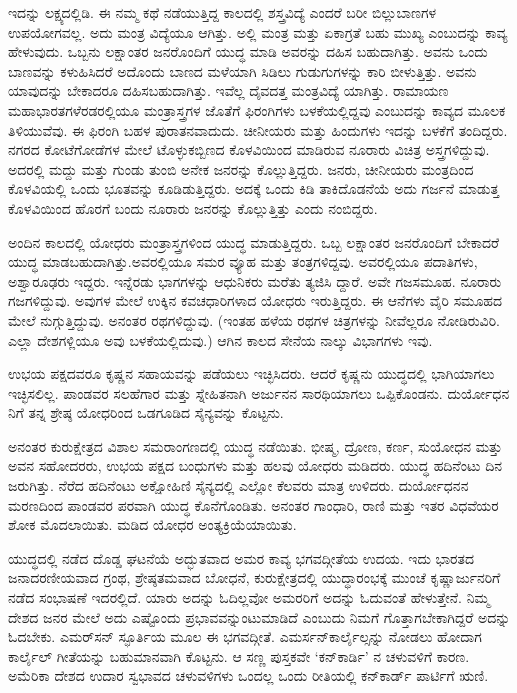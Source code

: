 ಇದನ್ನು ಲಕ್ಷ್ಯದಲ್ಲಿಡಿ. ಈ ನಮ್ಮ ಕಥೆ ನಡೆಯುತ್ತಿದ್ದ ಕಾಲದಲ್ಲಿ ಶಸ್ತ್ರವಿದ್ಯೆ ಎಂದರೆ ಬರೀ ಬಿಲ್ಲುಬಾಣಗಳ ಉಪಯೋಗವಲ್ಲ. ಅದು ಮಂತ್ರ ವಿದ್ಯೆಯೂ ಆಗಿತ್ತು. ಅಲ್ಲಿ ಮಂತ್ರ ಮತ್ತು ಏಕಾಗ್ರತೆ ಬಹು ಮುಖ್ಯ ಎಂಬುದನ್ನು ಕಾವ್ಯ ಹೇಳುವುದು. ಒಬ್ಬನು ಲಕ್ಷಾಂತರ ಜನರೊಂದಿಗೆ ಯುದ್ಧ ಮಾಡಿ ಅವರನ್ನು ದಹಿಸ ಬಹುದಾಗಿತ್ತು. ಅವನು ಒಂದು ಬಾಣವನ್ನು ಕಳುಹಿಸಿದರೆ ಅದೊಂದು ಬಾಣದ ಮಳೆಯಾಗಿ ಸಿಡಿಲು ಗುಡುಗುಗಳನ್ನು ಕಾರಿ ಬೀಳುತ್ತಿತ್ತು. ಅವನು ಯಾವುದನ್ನು ಬೇಕಾದರೂ ದಹಿಸಬಹುದಾಗಿತ್ತು. ಇವೆಲ್ಲ ದೈವದತ್ತ ಮಂತ್ರವಿದ್ಯೆ ಯಾಗಿತ್ತು. ರಾಮಾಯಣ ಮಹಾಭಾರತಗಳೆರಡರಲ್ಲಿಯೂ ಮಂತ್ರಾಸ್ತ್ರಗಳ ಜೊತೆಗೆ ಫಿರಂಗಿಗಳು ಬಳಕೆಯಲ್ಲಿದ್ದವು ಎಂಬುದನ್ನು ಕಾವ್ಯದ ಮೂಲಕ ತಿಳಿಯುವೆವು. ಈ ಫಿರಂಗಿ ಬಹಳ ಪುರಾತನವಾದುದು. ಚೀನೀಯರು ಮತ್ತು ಹಿಂದುಗಳು ಇದನ್ನು ಬಳಕೆಗೆ ತಂದಿದ್ದರು. ನಗರದ ಕೋಟೆಗೋಡೆಗಳ ಮೇಲೆ ಟೊಳ್ಳುಕಬ್ಬಿಣದ ಕೊಳವಿಯಿಂದ ಮಾಡಿರುವ ನೂರಾರು ವಿಚಿತ್ರ ಅಸ್ತ್ರಗಳಿದ್ದುವು. ಅದರಲ್ಲಿ ಮದ್ದು ಮತ್ತು ಗುಂಡು ತುಂಬಿ ಅನೇಕ ಜನರನ್ನು ಕೊಲ್ಲುತ್ತಿದ್ದರು. ಜನರು, ಚೀನೀಯರು ಮಂತ್ರದಿಂದ ಕೊಳವಿಯಲ್ಲಿ ಒಂದು ಭೂತವನ್ನು ಕೂಡಿಡುತ್ತಿದ್ದರು. ಅದಕ್ಕೆ ಒಂದು ಕಿಡಿ ತಾಕಿದೊಡನೆಯೆ ಅದು ಗರ್ಜನೆ ಮಾಡುತ್ತ ಕೊಳವಿಯಿಂದ ಹೊರಗೆ ಬಂದು ನೂರಾರು ಜನರನ್ನು ಕೊಲ್ಲುತ್ತಿತ್ತು ಎಂದು ನಂಬಿದ್ದರು.

ಅಂದಿನ ಕಾಲದಲ್ಲಿ ಯೋಧರು ಮಂತ್ರಾಸ್ತ್ರಗಳಿಂದ ಯುದ್ಧ ಮಾಡುತ್ತಿದ್ದರು. ಒಬ್ಬ ಲಕ್ಷಾಂತರ ಜನರೊಂದಿಗೆ ಬೇಕಾದರೆ ಯುದ್ಧ ಮಾಡಬಹುದಾಗಿತ್ತು.ಅವರಲ್ಲಿಯೂ ಸಮರ ವ್ಯೂಹ ಮತ್ತು ತಂತ್ರಗಳಿದ್ದವು. ಅವರಲ್ಲಿಯೂ ಪದಾತಿಗಳು, ಅಶ್ವಾರೂಢರು ಇದ್ದರು. ಇನ್ನೆರಡು ಭಾಗಗಳನ್ನು ಆಧುನಿಕರು ಮರೆತು ತ್ಯಜಿಸಿ ದ್ದಾರೆ. ಅವೇ ಗಜಸಮೂಹ. ನೂರಾರು ಗಜಗಳಿದ್ದುವು. ಅವುಗಳ ಮೇಲೆ ಉಕ್ಕಿನ ಕವಚಧಾರಿಗಳಾದ ಯೋಧರು ಇರುತ್ತಿದ್ದರು. ಈ ಆನೆಗಳು ವೈರಿ ಸಮೂಹದ ಮೇಲೆ ನುಗ್ಗುತ್ತಿದ್ದುವು. ಅನಂತರ ರಥಗಳಿದ್ದುವು. (ಇಂತಹ ಹಳೆಯ ರಥಗಳ ಚಿತ್ರಗಳನ್ನು ನೀವೆಲ್ಲರೂ ನೋಡಿರುವಿರಿ. ಎಲ್ಲಾ ದೇಶಗಳ್ಲಿಯೂ ಅವು ಬಳಕೆಯಲ್ಲಿದುವು.) ಆಗಿನ ಕಾಲದ ಸೇನೆಯ ನಾಲ್ಕು ವಿಭಾಗಗಳು ಇವು.

ಉಭಯ ಪಕ್ಷದವರೂ ಕೃಷ್ಣನ ಸಹಾಯವನ್ನು ಪಡೆಯಲು ಇಚ್ಛಿಸಿದರು. ಆದರೆ ಕೃಷ್ಣನು ಯುದ್ಧದಲ್ಲಿ ಭಾಗಿಯಾಗಲು ಇಚ್ಛಿಸಲಿಲ್ಲ. ಪಾಂಡವರ ಸಲಹೆಗಾರ ಮತ್ತು ಸ್ನೇಹಿತನಾಗಿ ಅರ್ಜುನನ ಸಾರಥಿಯಾಗಲು ಒಪ್ಪಿಕೊಂಡನು. ದುರ್ಯೋಧನ ನಿಗೆ ತನ್ನ ಶ್ರೇಷ್ಠ ಯೋಧರಿಂದ ಒಡಗೂಡಿದ ಸೈನ್ಯವನ್ನು ಕೊಟ್ಟನು.

ಅನಂತರ ಕುರುಕ್ಷೇತ್ರದ ವಿಶಾಲ ಸಮರಾಂಗಣದಲ್ಲಿ ಯುದ್ಧ ನಡೆಯಿತು. ಭೀಷ್ಮ, ದ್ರೋಣ, ಕರ್ಣ, ಸುಯೋಧನ ಮತ್ತು ಅವನ ಸಹೋದರರು, ಉಭಯ ಪಕ್ಷದ ಬಂಧುಗಳು ಮತ್ತು ಹಲವು ಯೋಧರು ಮಡಿದರು. ಯುದ್ಧ ಹದಿನೆಂಟು ದಿನ ಜರುಗಿತ್ತು. ನೆರೆದ ಹದಿನೆಂಟು ಅಕ್ಷೋಹಿಣಿ ಸೈನ್ಯದಲ್ಲಿ ಎಲ್ಲೋ ಕೆಲವರು ಮಾತ್ರ ಉಳಿದರು. ದುರ್ಯೋಧನನ ಮರಣದಿಂದ ಪಾಂಡವರ ಪರವಾಗಿ ಯುದ್ಧ ಕೊನೆಗೊಂಡಿತು. ಅನಂತರ ಗಾಂಧಾರಿ, ರಾಣಿ ಮತ್ತು ಇತರ ವಿಧವೆಯರ ಶೋಕ ಮೊದಲಾಯಿತು. ಮಡಿದ ಯೋಧರ ಅಂತ್ಯಕ್ರಿಯೆಯಾಯಿತು.

ಯುದ್ಧದಲ್ಲಿ ನಡೆದ ದೊಡ್ಡ ಘಟನೆಯೆ ಅದ್ಭುತವಾದ ಅಮರ ಕಾವ್ಯ ಭಗವದ್ಗೀತೆಯ ಉದಯ. ಇದು ಭಾರತದ ಜನಾದರಣೀಯವಾದ ಗ್ರಂಥ, ಶ್ರೇಷ್ಠತಮವಾದ ಬೋಧನೆ, ಕುರುಕ್ಷೇತ್ರದಲ್ಲಿ ಯುದ್ಧಾರಂಭಕ್ಕೆ ಮುಂಚೆ ಕೃಷ್ಣಾರ್ಜುನರಿಗೆ ನಡೆದ ಸಂಭಾಷಣೆ ಇದರಲ್ಲಿದೆ. ಯಾರು ಅದನ್ನು ಓದಿಲ್ಲವೋ ಅಮರರಿಗೆ ಅದನ್ನು ಓದುವಂತೆ ಹೇಳುತ್ತೇನೆ. ನಿಮ್ಮ ದೇಶದ ಜನರ ಮೇಲೆ ಅದು ಎಷ್ಟೊಂದು ಪ್ರಭಾವವನ್ನುಂಟುಮಾಡಿದೆ ಎಂಬುದು ನಿಮಗೆ ಗೊತ್ತಾಗಬೇಕಾಗಿದ್ದರೆ ಅದನ್ನು ಓದಬೇಕು. ಎಮರ್​ಸನ್​ ಸ್ಫೂರ್ತಿಯ ಮೂಲ ಈ ಭಗವದ್ಗೀತೆ. ಎಮರ್ಸನ್​ ಕಾರ್ಲೈಲ್ಸನ್ನು ನೋಡಲು ಹೋದಾಗ ಕಾರ್ಲೈಲ್​ ಗೀತೆಯನ್ನು ಬಹುಮಾನವಾಗಿ ಕೊಟ್ಟನು. ಆ ಸಣ್ಣ ಪುಸ್ತಕವೇ ‘ಕನ್​ಕಾರ್ಡಿ’ ನ ಚಳುವಳಿಗೆ ಕಾರಣ. ಅಮೆರಿಕಾ ದೇಶದ ಉದಾರ ಸ್ವಭಾವದ ಚಳುವಳಿಗಳು ಒಂದಲ್ಲ ಒಂದು ರೀತಿಯಲ್ಲಿ ಕನ್​ಕಾರ್ಡ್​ ಪಾರ್ಟಿಗೆ ಋಣಿ.

